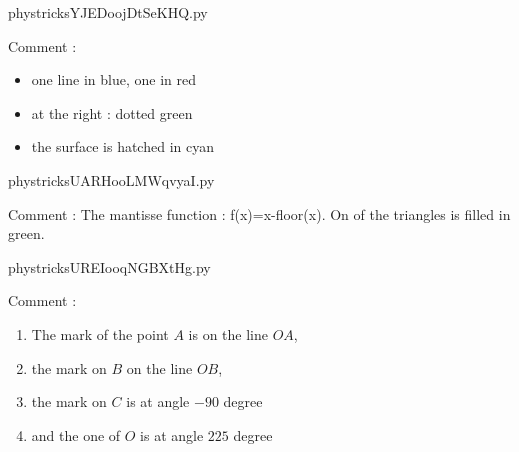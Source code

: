 



    \newcommand{\CaptionFigYJEDoojDtSeKHQ}{<+Type your caption here+>}
    \begin{center}
        
    \end{center}
    phystricksYJEDoojDtSeKHQ.py

    Comment : \begin{itemize}
    \item one line in blue, one in red
    \item at the right : dotted green 
    \item the surface is hatched in cyan
    \end{itemize}
    

    \clearpage
    


    \newcommand{\CaptionFigUARHooLMWqvyaI}{<+Type your caption here+>}
    \begin{center}
        
    \end{center}
    phystricksUARHooLMWqvyaI.py

    Comment : The mantisse function : f(x)=x-floor(x).  On of the triangles is filled in green.

    \clearpage
    


    \newcommand{\CaptionFigUREIooqNGBXtHg}{<+Type your caption here+>}
    \begin{center}
        
    \end{center}
    phystricksUREIooqNGBXtHg.py

    Comment : 
    \begin{enumerate}
    \item
    The mark of the point \( A\)  is on the line \( OA\),
    \item
    the mark on $B$ on the line $OB$, 
    \item
    the mark on $C$ is at angle $-90$ degree
    \item
    and the one of \( O\) is at angle \( 225\) degree
    \end{enumerate}
    

    \clearpage
    


